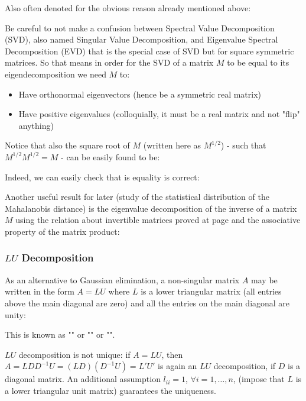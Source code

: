 	Also often denoted for the obvious reason already mentioned above:
	
	
	\begin{tcolorbox}[colback=red!5,borderline={1mm}{2mm}{red!5},arc=0mm,boxrule=0pt]
\bcbombe Be careful to not make a confusion between Spectral Value Decomposition (SVD), also named Singular Value Decomposition, and Eigenvalue Spectral Decomposition (EVD) that is the special case of SVD but for square symmetric matrices. So that means in order for the SVD of a matrix $M$ to be equal to its eigendecomposition we need $M$ to:
	\begin{itemize}
		\item Have orthonormal eigenvectors (hence be a symmetric real matrix)
	
		\item Have positive eigenvalues (colloquially, it must be a real matrix and not "flip" anything)
	\end{itemize}	
	\end{tcolorbox}
	Notice that also the square root of $M$ (written here as $M^{1/2}$) - such that $M^{1/2}M^{1/2}=M$ - can be easily found to be:
	
	Indeed, we can easily check that is equality is correct:
	
	Another useful result for later (study of the statistical distribution of the Mahalanobis distance) is the eigenvalue decomposition of the inverse of a matrix $M$ using the relation about invertible matrices proved at page \pageref{inverse matrix property} and the associative property of the matrix product\label{inverse eigendecompsosition}:
	
	
	\subsubsection{$LU$ Decomposition}\label{lu decomposition}
	As an alternative to Gaussian elimination, a non-singular matrix $A$ may be written in the form $A = LU$ where $L$ is a lower triangular matrix (all entries above the main diagonal are zero) and all the entries on the main diagonal are unity:	
	
	This is known as "" or "" or "".
	
	\begin{tcolorbox}[title=Remark,colframe=black,arc=10pt]
	$LU$ decomposition is not unique: if $A = LU$, then $A = LDD^{-1}U=(LD)(D^{-1}U) = L' U'$ is again an $LU$ decomposition, if $D$ is a diagonal matrix. An additional assumption $l_{ii} = 1$, $\forall i = 1, \ldots, n$, (impose that $L$ is a lower triangular unit matrix) guarantees the uniqueness.
	\end{tcolorbox}
	
